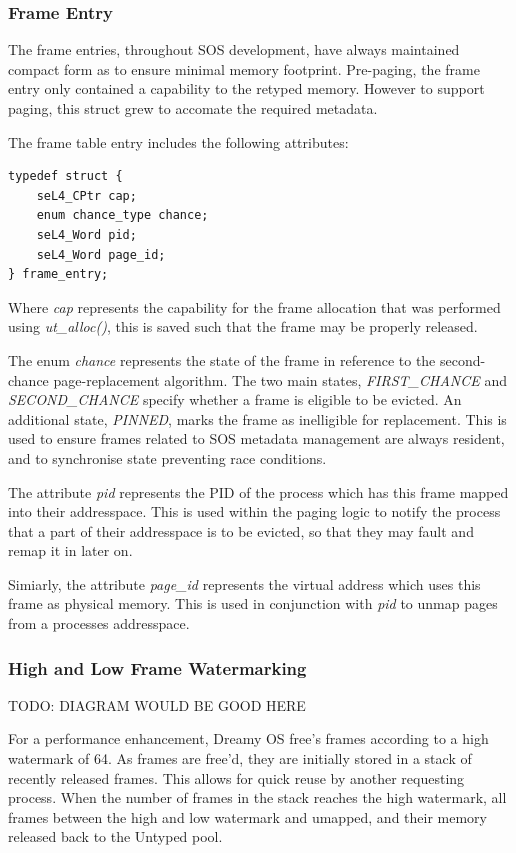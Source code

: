 \documentclass[runningheads,a4paper]{llncs}
\begin{document}
\subsubsection{Frame Entry}

The frame entries, throughout SOS development, have always maintained compact form as to ensure minimal memory footprint. Pre-paging, the frame entry only contained a capability to the retyped memory. However to support paging, this struct grew to accomate the required metadata.

The frame table entry includes the following attributes:

\begin{lstlisting}[style=CStyle]
typedef struct {
    seL4_CPtr cap;
    enum chance_type chance;
    seL4_Word pid;
    seL4_Word page_id;
} frame_entry;
\end{lstlisting}

Where \textit{cap} represents the capability for the frame allocation that was performed using \textit{ut\_alloc()}, this is saved such that the frame may be properly released.

The enum \textit{chance} represents the state of the frame in reference to the second-chance page-replacement algorithm. The two main states, \textit{FIRST\_CHANCE} and \textit{SECOND\_CHANCE} specify whether a frame is eligible to be evicted. An additional state, \textit{PINNED}, marks the frame as inelligible for replacement. This is used to ensure frames related to SOS metadata management are always resident, and to synchronise state preventing race conditions.

The attribute \textit{pid} represents the PID of the process which has this frame mapped into their addresspace. This is used within the paging logic to notify the process that a part of their addresspace is to be evicted, so that they may fault and remap it in later on.

Simiarly, the attribute \textit{page\_id} represents the virtual address which uses this frame as physical memory. This is used in conjunction with \textit{pid} to unmap pages from a processes addresspace.

\subsubsection{High and Low Frame Watermarking}

TODO: DIAGRAM WOULD BE GOOD HERE

For a performance enhancement, Dreamy OS free's frames according to a high watermark of 64. As frames are free'd, they are initially stored in a stack of recently released frames. This allows for quick reuse by another requesting process. When the number of frames in the stack reaches the high watermark, all frames between the high and low watermark and umapped, and their memory released back to the Untyped pool.
\end{document}
